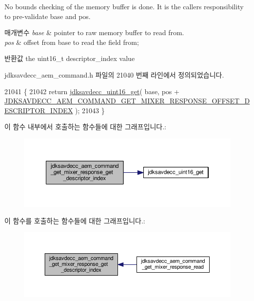 No bounds checking of the memory buffer is done. It is the caller\textquotesingle{}s responsibility to pre-\/validate base and pos.


\begin{DoxyParams}{매개변수}
{\em base} & pointer to raw memory buffer to read from. \\
\hline
{\em pos} & offset from base to read the field from; \\
\hline
\end{DoxyParams}
\begin{DoxyReturn}{반환값}
the uint16\+\_\+t descriptor\+\_\+index value 
\end{DoxyReturn}


jdksavdecc\+\_\+aem\+\_\+command.\+h 파일의 21040 번째 라인에서 정의되었습니다.


\begin{DoxyCode}
21041 \{
21042     \textcolor{keywordflow}{return} \hyperlink{group__endian_ga3fbbbc20be954aa61e039872965b0dc9}{jdksavdecc\_uint16\_get}( base, pos + 
      \hyperlink{group__command__get__mixer__response_ga6d836a6f1b8eaa84d5b4ba840e916c59}{JDKSAVDECC\_AEM\_COMMAND\_GET\_MIXER\_RESPONSE\_OFFSET\_DESCRIPTOR\_INDEX}
       );
21043 \}
\end{DoxyCode}


이 함수 내부에서 호출하는 함수들에 대한 그래프입니다.\+:
\nopagebreak
\begin{figure}[H]
\begin{center}
\leavevmode
\includegraphics[width=350pt]{group__command__get__mixer__response_ga339a8e63e5493b79b5352aaab91fe04b_cgraph}
\end{center}
\end{figure}




이 함수를 호출하는 함수들에 대한 그래프입니다.\+:
\nopagebreak
\begin{figure}[H]
\begin{center}
\leavevmode
\includegraphics[width=350pt]{group__command__get__mixer__response_ga339a8e63e5493b79b5352aaab91fe04b_icgraph}
\end{center}
\end{figure}


